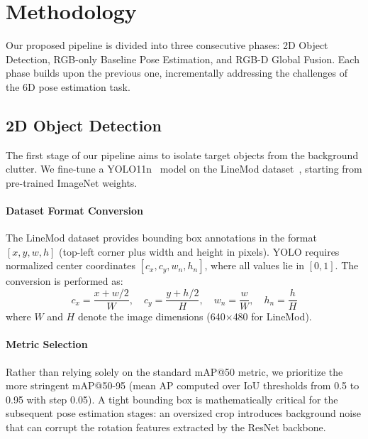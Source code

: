 \section{Methodology}
\label{sec:method}

Our proposed pipeline is divided into three consecutive phases: 2D Object Detection, RGB-only Baseline Pose Estimation, and RGB-D Global Fusion. Each phase builds upon the previous one, incrementally addressing the challenges of the 6D pose estimation task.



\subsection{2D Object Detection}
\label{sec:method_detection}

The first stage of our pipeline aims to isolate target objects from the background clutter. We fine-tune a YOLO11n~\cite{ultralytics2024yolo11} model on the LineMod dataset~\cite{hinterstoisser2012model}, starting from pre-trained ImageNet weights.

\paragraph{Dataset Format Conversion}
The LineMod dataset provides bounding box annotations in the format $[x, y, w, h]$ (top-left corner plus width and height in pixels). YOLO requires normalized center coordinates $[c_x, c_y, w_n, h_n]$, where all values lie in $[0,1]$. The conversion is performed as:
\begin{equation}
    c_x = \frac{x + w/2}{W}, \quad c_y = \frac{y + h/2}{H}, \quad w_n = \frac{w}{W}, \quad h_n = \frac{h}{H}
    \label{eq:bbox_conv}
\end{equation}
where $W$ and $H$ denote the image dimensions (640$\times$480 for LineMod).

\paragraph{Metric Selection}
Rather than relying solely on the standard mAP@50 metric, we prioritize the more stringent mAP@50-95 (mean AP computed over IoU thresholds from 0.5 to 0.95 with step 0.05). A tight bounding box is mathematically critical for the subsequent pose estimation stages: an oversized crop introduces background noise that can corrupt the rotation features extracted by the ResNet backbone.

